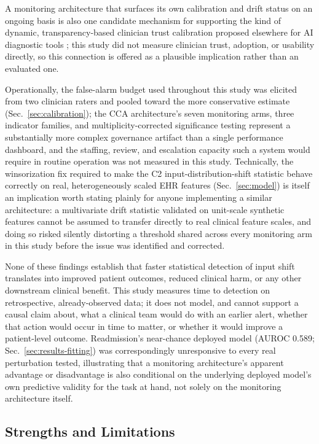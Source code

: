 \documentclass[preprintsapa,article,submit,oneauthor]{Definitions/mdpi}
\begin{document}
A monitoring architecture that surfaces its own calibration and drift status on an ongoing basis is also one candidate mechanism for supporting the kind of dynamic, transparency-based clinician trust calibration proposed elsewhere for AI diagnostic tools \citep{yu2025trust}; this study did not measure clinician trust, adoption, or usability directly, so this connection is offered as a plausible implication rather than an evaluated one.

Operationally, the false-alarm budget used throughout this study was elicited from two clinician raters and pooled toward the more conservative estimate (Sec.~\ref{sec:calibration}); the CCA architecture's seven monitoring arms, three indicator families, and multiplicity-corrected significance testing represent a substantially more complex governance artifact than a single performance dashboard, and the staffing, review, and escalation capacity such a system would require in routine operation was not measured in this study. Technically, the winsorization fix required to make the C2 input-distribution-shift statistic behave correctly on real, heterogeneously scaled EHR features (Sec.~\ref{sec:model}) is itself an implication worth stating plainly for anyone implementing a similar architecture: a multivariate drift statistic validated on unit-scale synthetic features cannot be assumed to transfer directly to real clinical feature scales, and doing so risked silently distorting a threshold shared across every monitoring arm in this study before the issue was identified and corrected.

None of these findings establish that faster statistical detection of input shift translates into improved patient outcomes, reduced clinical harm, or any other downstream clinical benefit. This study measures time to detection on retrospective, already-observed data; it does not model, and cannot support a causal claim about, what a clinical team would do with an earlier alert, whether that action would occur in time to matter, or whether it would improve a patient-level outcome. Readmission's near-chance deployed model (AUROC 0.589; Sec.~\ref{sec:results-fitting}) was correspondingly unresponsive to every real perturbation tested, illustrating that a monitoring architecture's apparent advantage or disadvantage is also conditional on the underlying deployed model's own predictive validity for the task at hand, not solely on the monitoring architecture itself.

\subsection{Strengths and Limitations}\label{sec:disc-limitations}
\end{document}
